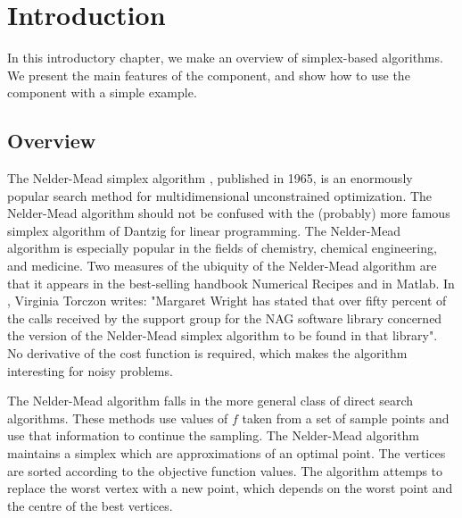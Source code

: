 \chapter{Introduction}

In this introductory chapter, we make an overview of simplex-based algorithms.
We present the main features of the  component, and 
show how to use the component with a simple example.

\section{Overview}

The Nelder-Mead simplex algorithm \cite{citeulike:3009487}, published in 1965, is an enormously 
popular search method for multidimensional unconstrained optimization. 
The Nelder-Mead algorithm should not be confused with the (probably) 
more famous simplex algorithm of Dantzig for linear programming. The 
Nelder-Mead algorithm is especially popular in the fields of chemistry, 
chemical engineering, and medicine. Two measures of the ubiquity of the 
Nelder-Mead algorithm are that it appears in the best-selling handbook 
Numerical Recipes and in Matlab. In \cite{Torczon89multi-directionalsearch},
Virginia Torczon writes: "Margaret Wright has stated that over
fifty percent of the calls received by the support group for the NAG
software library concerned the version of the Nelder-Mead 
simplex algorithm to be found in that library". No derivative of the cost function is 
required, which makes the algorithm interesting for noisy problems.

The Nelder-Mead algorithm falls in the more general class of direct 
search algorithms. These methods use values of $f$ taken from a set of 
sample points and use that information to continue the sampling. The 
Nelder-Mead algorithm maintains a simplex which are approximations of an 
optimal point. The vertices are sorted according to the objective 
function values. The algorithm attemps to replace the worst vertex with 
a new point, which depends on the worst point and the centre of the best 
vertices. 

